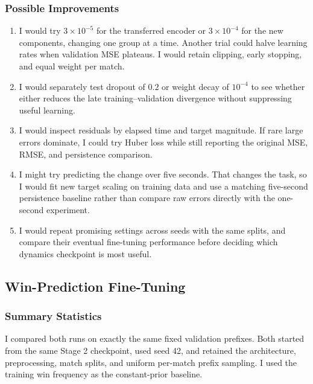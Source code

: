 \documentclass[11pt]{article}
\begin{document}
\subsubsection{Possible Improvements}
    \begin{enumerate}
        \item I would try $3\times10^{-5}$ for the transferred encoder or
        $3\times10^{-4}$ for the new components, changing one group at a time.
        Another trial could halve learning rates when validation MSE plateaus.
        I would retain clipping, early stopping, and equal weight per match.
        \item I would separately test dropout of $0.2$ or weight decay of
        $10^{-4}$ to see whether either reduces the late training--validation
        divergence without suppressing useful learning.
        \item I would inspect residuals by elapsed time and target magnitude.
        If rare large errors dominate, I could try Huber loss while still
        reporting the original MSE, RMSE, and persistence comparison.
        \item I might try predicting the change over five seconds. That changes
        the task, so I would fit new target scaling on training data and use a
        matching five-second persistence baseline rather than compare raw errors
        directly with the one-second experiment.
        \item I would repeat promising settings across seeds with the same
        splits, and compare their eventual fine-tuning performance before
        deciding which dynamics checkpoint is most useful.
    \end{enumerate}

\clearpage
\subsection{Win-Prediction Fine-Tuning}
\subsubsection{Summary Statistics}
    I compared both runs on exactly the same fixed validation prefixes.
    Both started from the same Stage 2 checkpoint, used seed 42, and retained
    the architecture, preprocessing, match splits, and uniform per-match prefix
    sampling. I used the training win frequency as the constant-prior baseline.
\end{document}

